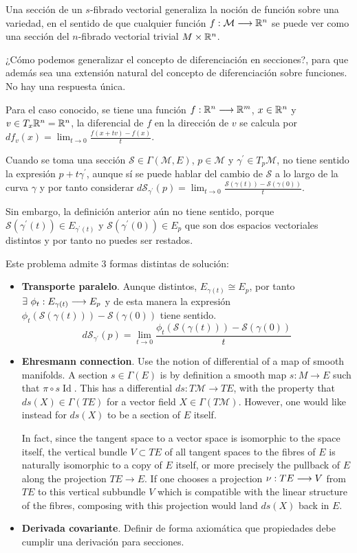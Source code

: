 Una sección de un $s$-fibrado vectorial generaliza la noción de función sobre una variedad, en el sentido de
que cualquier
función $f:\mathcal{M}\longrightarrow \mathbb{R}^n$ se puede ver como una sección del $n$-fibrado vectorial trivial $M\times\mathbb{R}^n$.

¿Cómo podemos generalizar el concepto de diferenciación en secciones?, para que además sea una extensión natural del
concepto de diferenciación sobre funciones.
No hay una respuesta única.

Para el caso conocido, se tiene una función $f:\mathbb{R}^n\longrightarrow \mathbb{R}^m$, $x\in\mathbb{R}^n$ y $v\in T_x \mathbb{R}^n=\mathbb{R}^n$, la diferencial
de $f$ en la dirección de $v$ se calcula por $df_v(x)=\lim_{t\to 0}{\frac {f(x+tv)-f(x)}{t}}$.

Cuando se toma una sección $\mathcal{S}\in\Gamma(\mathcal{M}, E)$, $p\in\mathcal{M}$ y $\gamma^{'}\in T_p \mathcal{M}$, no tiene sentido la
expresión $p+t\gamma^{'}$, aunque sí se puede hablar del cambio de $\mathcal{S}$ a lo largo de la curva $\gamma$
y por tanto considerar $d\mathcal{S}_{\gamma^{'}}(p)=\lim_{t\to 0}\frac{\mathcal{S}(\gamma (t))-\mathcal{S}
(\gamma (0))}{t}$.

Sin embargo, la definición anterior aún no tiene sentido, porque $\mathcal{S}(\gamma^{'}(t))\in
E_{\gamma^{'}(t)}$ y $\mathcal{S}(\gamma^{'}(0))\in E_p$ que son dos espacios vectoriales distintos y
por tanto no puedes ser restados.

Este problema admite 3 formas distintas de solución:
\begin{itemize}
  \item \textbf{Transporte paralelo}.
  Aunque distintos, $E_{\gamma(t)}\cong E_p$, por tanto $\exists\ \phi_t:E_{\gamma(t)
  }\longrightarrow E_p$ y de esta manera la expresión $\phi_t(\mathcal{S}(\gamma (t)))-\mathcal{S}(\gamma (0))$ tiene sentido.
  \[
    d\mathcal{S}_{\gamma^{'}}(p)=\lim_{t\to 0}\frac{\phi_t(\mathcal{S}(\gamma (t)))-\mathcal{S}
    (\gamma (0))}{t}
  \]

  \item \textbf{Ehresmann connection}.
  Use the notion of differential of a map of smooth manifolds.
  A section $s\in \Gamma (E)$ is by definition a smooth map $s:M\to E$ such
  that $\pi \circ s\operatorname{Id}$.
  This has a differential $ds:T\mathcal{M}\to TE$, with the property that $ds(X)\in \Gamma (TE)$
  for a vector field $X\in \Gamma (T\mathcal{M})$.
  However, one would like instead for $ds(X)$ to be a section of $E$ itself.

  In fact, since the tangent space to a vector space is isomorphic to the space itself, the vertical bundle
  $V\subset TE$ of all tangent spaces to the fibres of $E$ is naturally isomorphic to a copy of $E$
  itself, or more precisely the pullback of $E$ along the projection $TE\to E$.
  If one chooses a projection $\nu:TE\longrightarrow V$ from $TE$ to this vertical subbundle
  $V$ which is compatible with the linear structure of the fibres, composing with this projection would land
  $ds(X)$ back in $E$.


  \item \textbf{Derivada covariante}.
  Definir de forma axiomática que propiedades debe cumplir una derivación para secciones.
\end{itemize}


